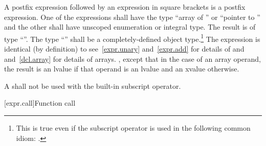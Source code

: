 \pnum
{}%
%
A postfix expression followed by an expression in square brackets is a
postfix expression. One of the expressions shall have the type ``array of
'' or ``pointer
to '' and the other shall have unscoped enumeration or integral type.
The result is of type ``''.
%
The type ``'' shall be a completely-defined object type.\footnote{This
is true even if the subscript operator is used in the following common idiom:
.}
The expression  is identical (by definition) to
\enternote 
see~\ref{expr.unary} and~\ref{expr.add} for details of \tcode{*} and
\tcode{+} and~\ref{dcl.array} for details of arrays.
\exitnote, except that in the case of an array operand, the result is an lvalue
if that operand is an lvalue and an xvalue otherwise.

\pnum
A  shall not be used with the built-in subscript operator.

[expr.call]{Function call}


